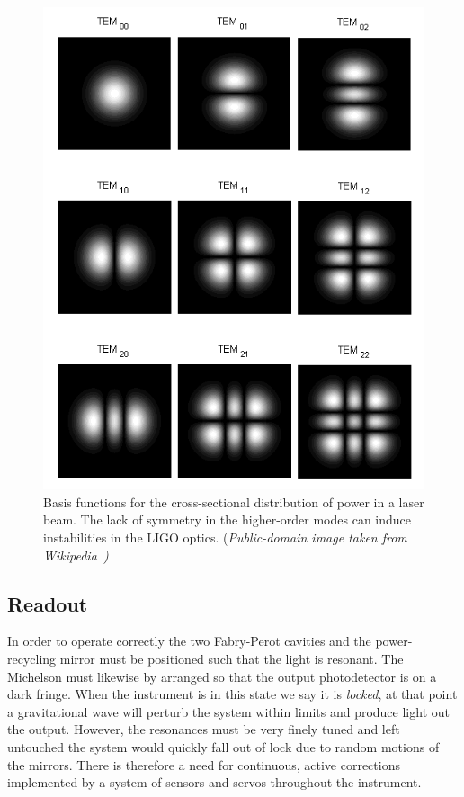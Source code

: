 \begin{figure}
  \includegraphics[width=\linewidth]{figures/detectors/TEMmn}
  \caption[Laser modes]{
  \label{f:hermite_gauss}
Basis functions for the cross-sectional distribution of power in a
laser beam.  The lack of symmetry in the higher-order modes can induce
instabilities in the LIGO optics. (\it{Public-domain image taken from
Wikipedia}~\cite{wikipedia:temmn})
}
\end{figure}%

\subsection{Readout}
\label{ssec:readout}

In order to operate correctly the two Fabry-Perot cavities and the
power-recycling mirror must be positioned such that the light is
resonant.  The Michelson must likewise by arranged so that the output
photodetector is on a dark fringe.  When the instrument is in this
state we say it is \emph{locked}, at that point a gravitational wave
will perturb the system within limits and produce light out the
output.  However, the resonances must be very finely tuned and left
untouched the system would quickly fall out of lock due to random
motions of the mirrors.  There is therefore a need for continuous,
active corrections implemented by a system of sensors and servos
throughout the instrument.

